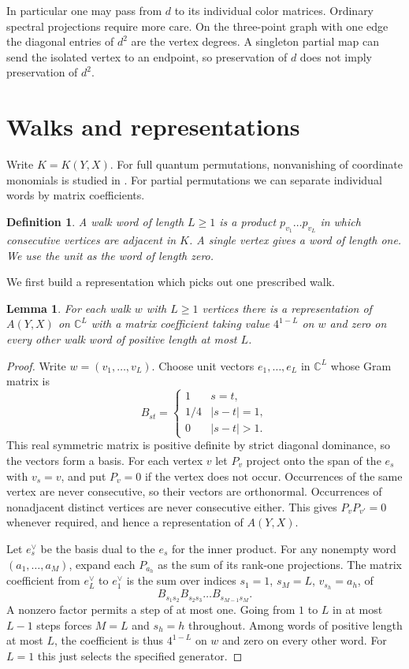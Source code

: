 \documentclass[11pt,a4paper]{article}
\newtheorem{lem}[thm]{Lemma}
\newtheorem{defn}[thm]{Definition}
\begin{document}
In particular one may pass from $d$ to its individual color matrices. Ordinary spectral projections require more care. On the three-point graph with one edge the diagonal entries of $d^2$ are the vertex degrees. A singleton partial map can send the isolated vertex to an endpoint, so preservation of $d$ does not imply preservation of $d^2$.

\section{Walks and representations}\label{walksection}

Write $K=K(Y,X)$. For full quantum permutations, nonvanishing of coordinate monomials is studied in \cite{mcc}. For partial permutations we can separate individual words by matrix coefficients.

\begin{defn}
A walk word of length $L\geq1$ is a product $p_{v_1}\ldots p_{v_L}$ in which consecutive vertices are adjacent in $K$. A single vertex gives a word of length one. We use the unit as the word of length zero.
\end{defn}

We first build a representation which picks out one prescribed walk.

\begin{lem}\label{separator}
For each walk $w$ with $L\geq1$ vertices there is a representation of $A(Y,X)$ on $\mathbb C^L$ with a matrix coefficient taking value $4^{1-L}$ on $w$ and zero on every other walk word of positive length at most $L$.
\end{lem}
\begin{proof}
Write $w=(v_1,\ldots,v_L)$. Choose unit vectors $e_1,\ldots,e_L$ in $\mathbb C^L$ whose Gram matrix is
\[
 B_{st}=\begin{cases}
 1&s=t,\\
 1/4&|s-t|=1,\\
 0&|s-t|>1.
 \end{cases}
\]
This real symmetric matrix is positive definite by strict diagonal dominance, so the vectors form a basis. For each vertex $v$ let $P_v$ project onto the span of the $e_s$ with $v_s=v$, and put $P_v=0$ if the vertex does not occur. Occurrences of the same vertex are never consecutive, so their vectors are orthonormal. Occurrences of nonadjacent distinct vertices are never consecutive either. This gives $P_vP_{v'}=0$ whenever required, and hence a representation of $A(Y,X)$.

Let $e_s^\vee$ be the basis dual to the $e_s$ for the inner product. For any nonempty word $(a_1,\ldots,a_M)$, expand each $P_{a_h}$ as the sum of its rank-one projections. The matrix coefficient from $e_L^\vee$ to $e_1^\vee$ is the sum over indices $s_1=1$, $s_M=L$, $v_{s_h}=a_h$, of
\[
 B_{s_1s_2}B_{s_2s_3}\ldots B_{s_{M-1}s_M}.
\]
A nonzero factor permits a step of at most one. Going from $1$ to $L$ in at most $L-1$ steps forces $M=L$ and $s_h=h$ throughout. Among words of positive length at most $L$, the coefficient is thus $4^{1-L}$ on $w$ and zero on every other word. For $L=1$ this just selects the specified generator.
\end{proof}
\end{document}
